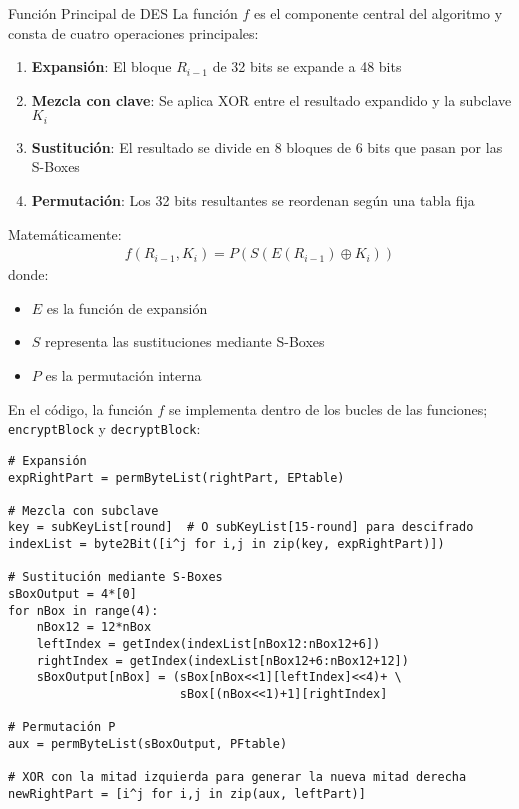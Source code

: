 \begin{cryptoanalysis}{Función Principal de DES}
	La función $f$ es el componente central del algoritmo y consta de cuatro operaciones principales:
	\begin{enumerate}
		\item \textbf{Expansión}: El bloque $R_{i-1}$ de 32 bits se expande a 48 bits
		\item \textbf{Mezcla con clave}: Se aplica XOR entre el resultado expandido y la subclave $K_i$
		\item \textbf{Sustitución}: El resultado se divide en 8 bloques de 6 bits que pasan por las S-Boxes
		\item \textbf{Permutación}: Los 32 bits resultantes se reordenan según una tabla fija
	\end{enumerate}

	Matemáticamente:
	\begin{align}
		f(R_{i-1}, K_i) = P(S(E(R_{i-1}) \oplus K_i))
	\end{align}
	donde:
	\begin{itemize}
		\item $E$ es la función de expansión
		\item $S$ representa las sustituciones mediante S-Boxes
		\item $P$ es la permutación interna
	\end{itemize}
\end{cryptoanalysis}

En el código, la función $f$ se implementa dentro de los bucles de las funciones;\\ \texttt{encryptBlock} y \texttt{decryptBlock}:

\begin{lstlisting}[style=cryptoalgo]
# Expansión
expRightPart = permByteList(rightPart, EPtable)

# Mezcla con subclave
key = subKeyList[round]  # O subKeyList[15-round] para descifrado
indexList = byte2Bit([i^j for i,j in zip(key, expRightPart)])

# Sustitución mediante S-Boxes
sBoxOutput = 4*[0]
for nBox in range(4):
    nBox12 = 12*nBox
    leftIndex = getIndex(indexList[nBox12:nBox12+6])
    rightIndex = getIndex(indexList[nBox12+6:nBox12+12])
    sBoxOutput[nBox] = (sBox[nBox<<1][leftIndex]<<4)+ \
                        sBox[(nBox<<1)+1][rightIndex]

# Permutación P
aux = permByteList(sBoxOutput, PFtable)

# XOR con la mitad izquierda para generar la nueva mitad derecha
newRightPart = [i^j for i,j in zip(aux, leftPart)]
\end{lstlisting}


